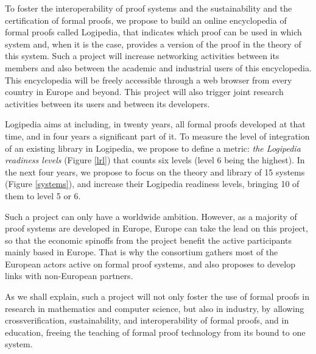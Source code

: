 To foster the interoperability of proof systems and the sustainability
and the certification of formal proofs, we propose to build an online
encyclopedia of formal proofs called {\sc Logipedia}, that indicates
which proof can be used in which system and, when it is the case,
provides a version of the proof in the theory of this system.  Such a
project will increase networking activities between its members and
also between the academic and industrial users of this encyclopedia.
This encyclopedia will be freely accessible through a web browser from
every country in Europe and beyond. This project will also trigger
joint research activities between its users and between its
developers.

{\sc Logipedia} aims at including, in twenty years, all formal proofs
developed at that time, and in four years a significant part of it. To
measure the level of integration of an existing library in {\sc
  Logipedia}, we propose to define a metric: {\em the {\sc Logipedia}
  readiness levels} (Figure \ref{lrl}) that counts six levels (level 6
being the highest).  In the next four years, we propose to focus on
the theory and library of 15 systems (Figure \ref{systems}), and
increase their {\sc Logipedia} readiness levels, bringing 10 of them
to level 5 or 6.

Such a project can only have a worldwide ambition. However, as a
majority of proof systems are developed in Europe, Europe can take the
lead on this project, so that the economic spinoffs from the project
benefit the active participants mainly based in Europe.  That is why
the consortium gathers most of the European actors active on formal
proof systems, and also proposes to develop links with non-European
partners.

As we shall explain, such a project will not only foster the use of
formal proofs in research in mathematics and computer science, but
also in industry, by allowing crossverification, sustainability, and
interoperability of formal proofs, and in education, freeing the
teaching of formal proof technology from its bound to one system. 


